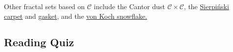 \noindent Other fractal sets based on $\mathcal C$ include the Cantor dust $\mathcal C\times\mathcal C$, the \href{http://en.wikipedia.org/wiki/Sierpinski_carpet}{Sierpi\'nski carpet} and \href{http://en.wikipedia.org/wiki/Sierpinski_triangle}{gasket}, and the \href{http://en.wikipedia.org/wiki/Koch_snowflake}{von Koch snowflake.}





\subsection*{Reading Quiz}

